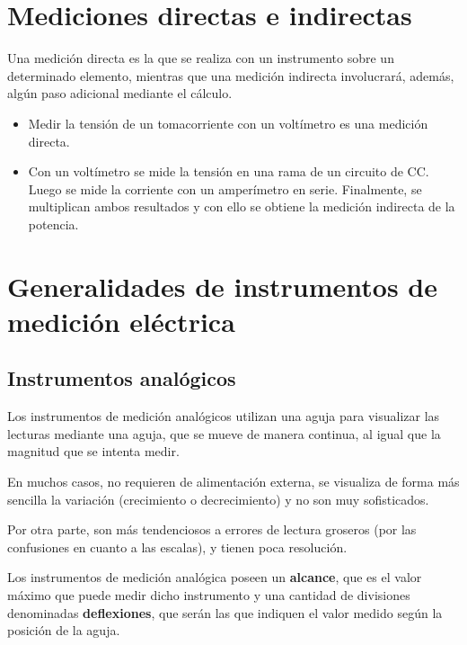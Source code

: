 \section{Mediciones directas e indirectas}

Una medición directa es la que se realiza con un instrumento sobre un determinado elemento, mientras que una medición indirecta involucrará, además, algún paso adicional mediante el cálculo.
\begin{ejemplo}
	
	\begin{itemize}
	
		\item Medir la tensión de un tomacorriente con un voltímetro es una medición directa.
		\item Con un voltímetro se mide la tensión en una rama de un circuito de CC. Luego se mide la corriente con un amperímetro en serie. Finalmente, se multiplican ambos resultados y con ello se obtiene la medición indirecta de la potencia.
	\end{itemize}		
\end{ejemplo}

\section{Generalidades de instrumentos de medición eléctrica}

\subsection{Instrumentos analógicos}

Los instrumentos de medición analógicos utilizan una aguja para visualizar las lecturas mediante una aguja, que se mueve de manera continua, al igual que la magnitud que se intenta medir.

En muchos casos, no requieren de alimentación externa, se visualiza de forma más sencilla la variación (crecimiento o decrecimiento) y no son muy sofisticados. 

Por otra parte, son más tendenciosos a errores de lectura groseros (por las confusiones en cuanto a las escalas), y tienen poca resolución.

Los instrumentos de medición analógica poseen un \textbf{alcance}, que es el valor máximo que puede medir dicho instrumento y una cantidad de divisiones denominadas \textbf{deflexiones}, que serán las que indiquen el valor medido según la posición de la aguja.

